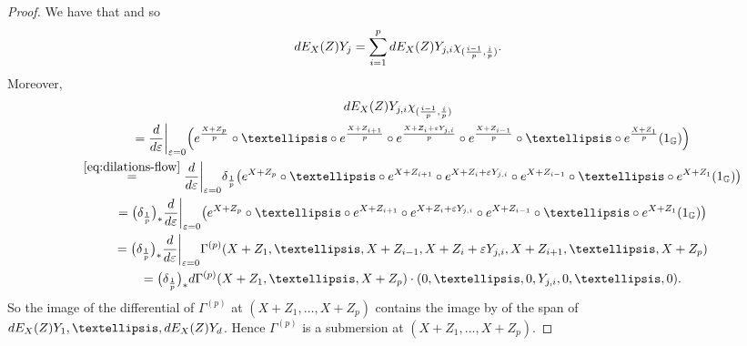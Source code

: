 \documentclass[10pt,a4paper]{amsart}
\begin{document}
\begin{proof}
We have that  and so
 \[{\rm d}E_X(Z)Y_j=\sum_{i=1}^p {\rm d}E_X(Z)Y_{j,i}\chi _{(\frac{i-1}p,\frac ip)}.\]
Moreover,
\begin{gather}
 {\rm d}E_X(Z)Y_{j,i}\chi _{(\frac{i-1}p,\frac ip)}\nonumber\\
 \qquad{}=\frac{{\rm d}}{{\rm d}\varepsilon}\biggr|_{\varepsilon=0}
 \Bigl({\rm e}^{\frac{X+Z_p}p}\circ\dots\circ {\rm e}^{\frac{X+Z_{i+1}}p}\circ {\rm e}^{\frac{X+Z_i+\varepsilon Y_{j,i}}p}\circ {\rm e}^{\frac{X+Z_{i-1}}p}\circ \dots\circ {\rm e}^{\frac{X+Z_1}p}(1_{\mathbb{G}})\Bigr)\nonumber\\
 \qquad{}\stackrel{\eqref{eq:dilations-flow}}{=}\frac{{\rm d}}{{\rm d}\varepsilon}\biggr|_{\varepsilon=0}
 \delta_{\frac1p}\bigl({\rm e}^{X+Z_p}\circ\dots\circ {\rm e}^{X+Z_{i+1}}\circ {\rm e}^{X+Z_i+\varepsilon Y_{j,i}}\circ {\rm e}^{X+Z_{i-1}}\circ \dots\circ {\rm e}^{X+Z_1}(1_{\mathbb{G}})\bigr)\nonumber\\
\qquad{}=\bigl(\delta_{\frac1p}\bigr)_*\frac{{\rm d}}{{\rm d}\varepsilon}\biggr|_{\varepsilon=0}\bigl({\rm e}^{X+Z_p}\circ\dots\circ {\rm e}^{X+Z_{i+1}}\circ {\rm e}^{X+Z_i+\varepsilon Y_{j,i}}\circ {\rm e}^{X+Z_{i-1}}\circ \dots\circ {\rm e}^{X+Z_1}(1_{\mathbb{G}})\bigr)\nonumber\\
 \qquad{}=\bigl(\delta_{\frac1p}\bigr)_*\frac{{\rm d}}{{\rm d}\varepsilon}\biggr|_{\varepsilon=0}
 \Gamma^{(p)}(X+Z_{1},\dots,X+Z_{i-1},X+Z_i+\varepsilon Y_{j,i},X+Z_{i+1}, \dots, X+Z_{p})\nonumber\\
\qquad{}=\bigl(\delta_{\frac1p}\bigr)_* {\rm d}\Gamma^{(p)}(X+Z_1,\dots,X+Z_p)\cdot (0,\dots,0, Y_{j,i},0,\dots,0).\label{eq:diffdilated}
\end{gather}
So
the image of the differential of
$\Gamma^{(p)}$
at $(X\!+\!Z_1,\dots,X\!+\!Z_p)$ contains the image by  of
the
span of ${\rm d}E_X(Z)Y_1,\dots,{\rm d}E_X(Z)Y_d$.
Hence $\Gamma^{(p)}$
is a submersion at $(X\!+\!Z_1,\dots,X\!+\!Z_p)$.
\end{proof}
\end{document}
